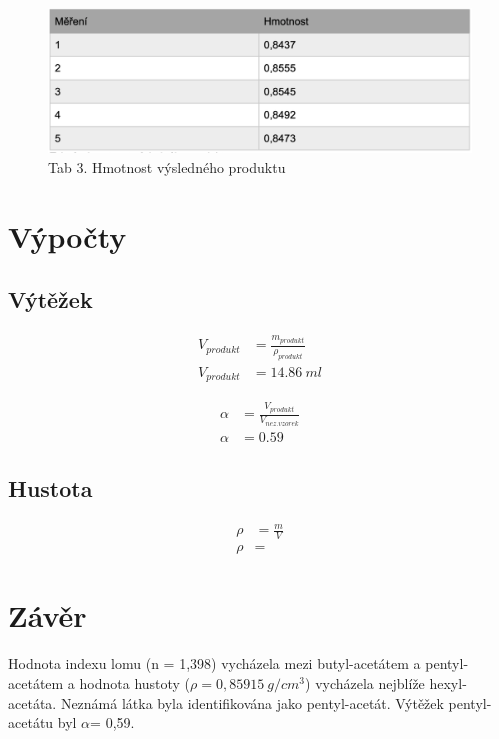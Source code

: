 \documentclass[13pt, a4paper, twoside]{article}
\begin{document}
\begin{figure}[H]
    \centering
    \includegraphics[width=6in]{uloha_9_tab_3.png}
    \caption*{Tab 3. Hmotnost výsledného produktu}
\end{figure}

\section*{Výpočty}
\subsection*{Výtěžek}
\begin{align*}
    V_{produkt} &= \frac{m_{produkt}}{\rho_{produkt}}\\
    V_{produkt} &= 14.86 \: ml
\end{align*}

\begin{align*}
    \alpha &= \frac{V_{produkt}}{V_{nez. vzorek}}\\
    \alpha &= 0.59
\end{align*}

\subsection*{Hustota}
\begin{align*}
    \rho &= \frac{m}{V}\\
    \rho &= 
\end{align*}

\section*{Závěr}
Hodnota indexu lomu (n = 1,398) vycházela mezi butyl-acetátem a pentyl-acetátem a hodnota hustoty ($\rho = 0,85915\: g/cm^3$) vycházela nejblíže hexyl-acetáta. Neznámá látka byla identifikována jako pentyl-acetát. Výtěžek pentyl-acetátu byl $\alpha$= 0,59.
\end{document}
